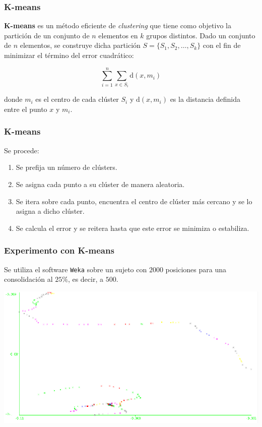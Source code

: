 \documentclass[10pt, spanish]{beamer}
\begin{document}
\begin{frame}[fragile]
\frametitle{K-means}
\textbf{K-means} es un m\'etodo eficiente de \textit{clustering} que tiene como objetivo la partici\'on de un conjunto de $n$ elementos en $k$ grupos distintos. Dado un conjunto de $n$ elementos, se construye dicha partici\'on $S=\{S_1, S_2, \ldots, S_k\}$ con el fin de minimizar el t\'ermino del error cuadr\'atico:

$$ \sum_{i=1}^{n} \sum_{x\in S_i} \text{d}(x,m_i)$$

donde $m_i$ es el centro de cada cl\'uster $S_i$ y $\text{d}(x, m_i)$ es la distancia definida entre el punto $x$ y $m_i$.

\end{frame}

\begin{frame}[fragile]
\frametitle{K-means}
Se procede:
\begin{enumerate}
	\item Se prefija un n\'umero de cl\'usters.
	\item Se asigna cada punto a su cl\'uster de manera aleatoria.
	\item Se itera sobre cada punto, encuentra el centro de cl\'uster m\'as cercano y se lo asigna a dicho cl\'uster.
	\item Se calcula el error y se reitera hasta que este error se minimiza o estabiliza.
\end{enumerate}
\end{frame}

\begin{frame}[fragile]
\frametitle{Experimento con K-means}
Se utiliza el software \texttt{Weka} sobre un sujeto con $2000$ posiciones para una consolidaci\'on al $25\%$, es decir, a $500$.

\begin{center}
	\includegraphics[scale=.43]{kMeansSujeto1.png}
\end{center}


\end{frame}
\end{document}
